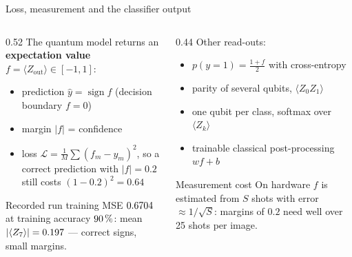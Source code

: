 \documentclass[aspectratio=169,11pt]{beamer}
\newcommand{\key}[1]{{\color{qdark}\textbf{#1}}}
\begin{document}
\begin{frame}[label=fLossOut]{Loss, measurement and the classifier output}
  \begin{columns}[T]
    \begin{column}{0.52\textwidth}
      \small
      The quantum model returns an \key{expectation value} $f = \langle Z_{\text{out}}\rangle \in [-1, 1]$:
      \begin{itemize}\itemsep1pt
        \item prediction $\hat y = \operatorname{sign}f$ (decision boundary $f = 0$)
        \item margin $|f|$ = confidence
        \item loss $\mathcal L = \frac1M\sum(f_m - y_m)^2$, so a correct prediction with $|f| = 0.2$ still costs $(1 - 0.2)^2 = 0.64$
      \end{itemize}
      \begin{alertblock}{Recorded run}
        \scriptsize training MSE $0.6704$ at training accuracy $90\,\%$: mean $|\langle Z_7\rangle| = 0.197$ --- correct signs, small margins.
      \end{alertblock}
    \end{column}
    \begin{column}{0.44\textwidth}
      \small Other read-outs:
      \begin{itemize}\itemsep1pt\scriptsize
        \item $p(y = 1) = \frac{1 + f}{2}$ with cross-entropy
        \item parity of several qubits, $\langle Z_0Z_1\rangle$
        \item one qubit per class, softmax over $\langle Z_k\rangle$
        \item trainable classical post-processing $w f + b$
      \end{itemize}
      \begin{block}{Measurement cost}
        \scriptsize On hardware $f$ is estimated from $S$ shots with error $\approx 1/\sqrt S$: margins of $0.2$ need well over 25 shots per image.
      \end{block}
    \end{column}
  \end{columns}
\end{frame}
\end{document}
